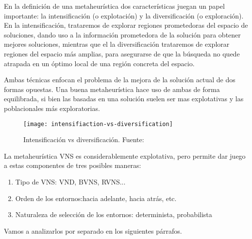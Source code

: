 En la definición de una metaheurística dos características juegan un papel importante: la intensificación (o explotación) y la diversificación (o exploración). En la intensificación, trataremos de explorar regiones prometedoras del espacio de soluciones, dando uso a la información prometedora de la solución para obtener mejores soluciones, mientras que el la diversificación trataremos de explorar regiones del espacio más amplias, para asegurarse de que la búsqueda no quede atrapada en un óptimo local de una región concreta del espacio.

Ambas técnicas enfocan el problema de la mejora de la solución actual de dos formas opuestas. Una buena metaheurística
hace uso de ambas de forma equilibrada, si bien las basadas en una solución suelen ser mas explotativas y las poblacionales más exploratorias.

\begin{figure}
	\centering	\texttt{[image: intensifiaction-vs-diversification]}
	\caption[Intensificación vs diversificación]{Intensificación vs diversificación. Fuente:~\cite{sota:metaheuristicas-design-impl}}
	\label{fig:intensifiaction-vs-diversification}
\end{figure}

La metaheurística \gls{VNS} es considerablemente explotativa, pero permite dar juego a estas componentes de tres posibles maneras:
\begin{enumerate}[label=\alph*.]
\item Tipo de VNS: VND, BVNS, RVNS...
\item Orden de los entornos:hacia adelante, hacia atrás, etc.
\item Naturaleza de selección de los entornos: determinista, probabilista
\end{enumerate}

Vamos a analizarlos por separado en los siguientes párrafos.

